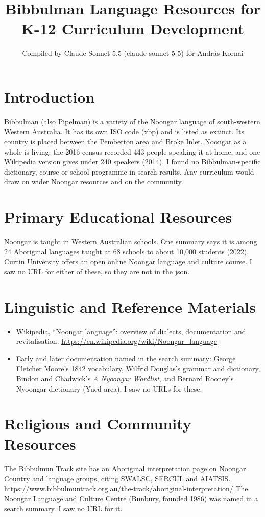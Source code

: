 \documentclass[12pt]{article}
\title{Bibbulman Language Resources for K-12 Curriculum Development}
\author{Compiled by Claude Sonnet 5.5 (claude-sonnet-5-5) for Andr\'as Kornai}
\date{}
\begin{document}
\maketitle

\section{Introduction}
Bibbulman (also Pipelman) is a variety of the Noongar language of south-western Western Australia. It has its own ISO code (xbp) and is listed as extinct. Its country is placed between the Pemberton area and Broke Inlet. Noongar as a whole is living: the 2016 census recorded 443 people speaking it at home, and one Wikipedia version gives under 240 speakers (2014). I found no Bibbulman-specific dictionary, course or school programme in search results. Any curriculum would draw on wider Noongar resources and on the community.

\section{Primary Educational Resources}
Noongar is taught in Western Australian schools. One summary says it is among 24 Aboriginal languages taught at 68 schools to about 10,000 students (2022). Curtin University offers an open online Noongar language and culture course. I saw no URL for either of these, so they are not in the json.

\section{Linguistic and Reference Materials}
\begin{itemize}
\item Wikipedia, ``Noongar language'': overview of dialects, documentation and revitalisation. \url{https://en.wikipedia.org/wiki/Noongar_language}
\item Early and later documentation named in the search summary: George Fletcher Moore's 1842 vocabulary, Wilfrid Douglas's grammar and dictionary, Bindon and Chadwick's \emph{A Nyoongar Wordlist}, and Bernard Rooney's Nyoongar dictionary (Yued area). I saw no URLs for these.
\end{itemize}

\section{Religious and Community Resources}
The Bibbulmun Track site has an Aboriginal interpretation page on Noongar Country and language groups, citing SWALSC, SERCUL and AIATSIS. \url{https://www.bibbulmuntrack.org.au/the-track/aboriginal-interpretation/}
The Noongar Language and Culture Centre (Bunbury, founded 1986) was named in a search summary. I saw no URL for it.
\end{document}
